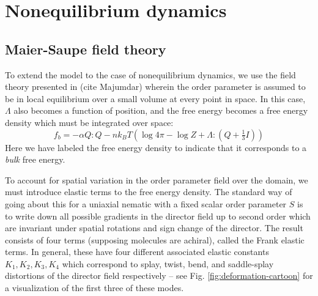 \documentclass[reqno]{article}
\begin{document}
  \section{Nonequilibrium dynamics} \label{nonequilibrium-dynamics}

  \subsection{Maier-Saupe field theory}
  To extend the model to the case of nonequilibrium dynamics, we use the field
  theory presented in (cite Majumdar) wherein the order parameter is assumed to
  be in local equilibrium over a small volume at every point in space.
  In this case, $\Lambda$ also becomes a function of position, and the free
  energy becomes a free energy density which must be integrated over space:
  \begin{equation}
    f_b
    =
    -\alpha Q : Q
    - n k_B T \left(\log 4 \pi - \log Z + \Lambda : \left(Q + \tfrac13 I \right) \right)
  \end{equation}
  Here we have labeled the free energy density to indicate that it corresponds
  to a \textit{bulk} free energy.
  
  To account for spatial variation in the order parameter field over the domain,
  we must introduce elastic terms to the free energy density.
  The standard way of going about this for a uniaxial nematic with a fixed
  scalar order parameter $S$ is to write down all possible gradients in the
  director field up to second order which are invariant under spatial rotations
  and sign change of the director.
  The result consists of four terms (supposing molecules are achiral), called
  the Frank elastic terms.
  In general, these have four different associated elastic constants $K_1, K_2,
  K_3, K_4$ which correspond to splay, twist, bend, and saddle-splay distortions of the
  director field respectively -- see Fig. \ref{fig:deformation-cartoon} for a visualization of the first
  three of these modes.
  
\end{document}
